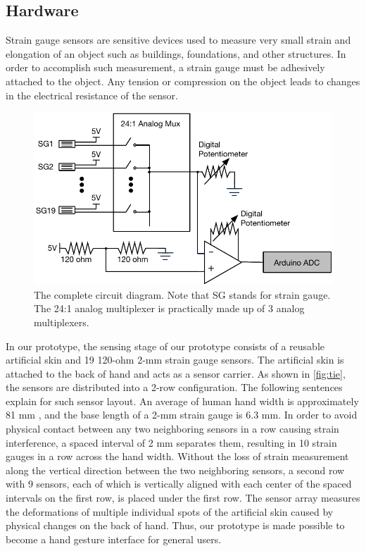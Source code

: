\documentclass{sigchi}
\begin{document}
\subsection{Hardware} 
Strain gauge sensors are sensitive devices used to measure very small strain and elongation of an object such as buildings, foundations, and other structures. In order to accomplish such measurement, a strain gauge must be adhesively attached to the object. Any tension or compression on the object leads to changes in the electrical resistance of the sensor.

\begin{figure}[t]
  \includegraphics[width=1\columnwidth]{figures/CompleteDiagram_v2.pdf}
  \caption{The complete circuit diagram. Note that SG stands for strain gauge. The 24:1 analog multiplexer is practically made up of 3 analog multiplexers.}
  \label{fig:completeCircuitDiagram}
\end{figure}

In our prototype, the sensing stage of our prototype consists of a reusable artificial skin and 19 120-ohm 2-mm strain gauge sensors. The artificial skin is attached to the back of hand and acts as a sensor carrier. As shown in \autoref{fig:tie}, the sensors are distributed into a 2-row configuration. The following sentences explain for such sensor layout. An average of human hand width is approximately 81 mm \cite{Kulaksiz2002257}, and the base length of a 2-mm strain gauge is 6.3 mm. In order to avoid physical contact between any two neighboring sensors in a row causing strain interference, a spaced interval of 2 mm separates them, resulting in 10 strain gauges in a row across the hand width. Without the loss of strain measurement along the vertical direction between the two neighboring sensors, a second row with 9 sensors, each of which is vertically aligned with each center of the spaced intervals on the first row, is placed under the first row. The sensor array measures the deformations of multiple individual spots of the artificial skin caused by physical changes on the back of hand. Thus, our prototype is made possible to become a hand gesture interface for general users.
\end{document}
